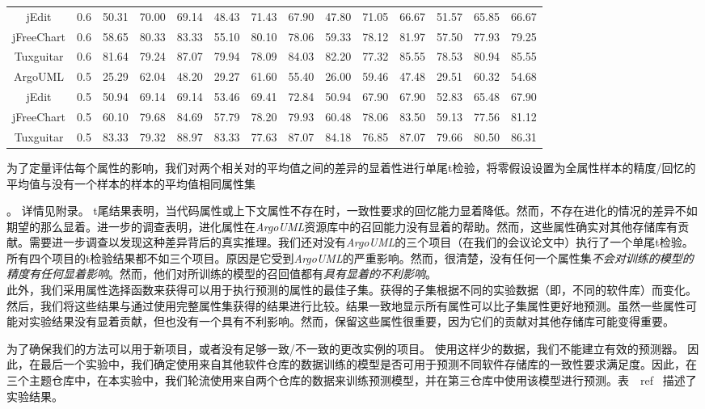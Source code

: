 {\begin{table}[htbp]
\begin{tabular}{cccccccccccccc}
jEdit&0.6&	50.31&	70.00&	69.14&	48.43&	71.43&	67.90&	47.80&	71.05&	66.67&	51.57&	65.85&	66.67\\
jFreeChart&0.6&	58.65&	80.33&	83.33&	55.10&	80.10&	78.06&	59.33&	78.12&	81.97&	57.50&	77.93&	79.25\\
Tuxguitar&0.6&	81.64&	79.24&	87.07&	79.94&	78.09&	84.03&	82.20&	77.32&	85.55&	78.53&	80.94&	85.55\\
ArgoUML&0.5&	25.29&	62.04&	48.20&	29.27&	61.60&	55.40&	26.00&	59.46&	47.48&	29.51&	60.32&	54.68\\
jEdit&0.5&	50.94&	69.14&	69.14&	53.46&	69.41&	72.84&	50.94&	67.90&	67.90&	52.83&	65.48&	67.90\\
jFreeChart&0.5&	60.10&	79.68&	84.69&	57.79&	78.20&	79.93&	60.48&	78.06&	83.50&	59.13&	77.56&	81.12\\
Tuxguitar&0.5&	83.33&	79.32&	88.97&	83.33&	77.63&	87.07&	84.18&	76.85&	87.07&	79.66&	80.50&      86.31\\
\bottomrule[1.5pt]
\end{tabular}
\end{table}

为了定量评估每个属性的影响，我们对两个相关对的平均值之间的差异的显着性进行单尾t检验，将零假设设置为全属性样本的精度/回忆的平均值与没有一个样本的样本的平均值相同属性集}。
详情见附录。 t尾结果表明，当代码属性或上下文属性不存在时，一致性要求的回忆能力显着降低。然而，不存在进化的情况的差异不如期望的那么显着。进一步的调查表明，进化属性在{\em ArgoUML}资源库中的召回能力没有显着的帮助。然而，这些属性确实对其他存储库有贡献。需要进一步调查以发现这种差异背后的真实推理。{我们还对没有{\em  ArgoUML}的三个项目（在我们的会议论文中）执行了一个单尾t检验。所有四个项目的t检验结果都不如三个项目。原因是它受到{\em ArgoUML}的严重影响。}然而，很清楚，没有任何一个属性集{\em 不会对训练的模型的精度有任何显着影响}。然而，他们对所训练的模型的召回值都有{\em 具有显着的不利影响}。 \\

此外，我们采用属性选择函数来获得可以用于执行预测的属性的最佳子集。获得的子集根据不同的实验数据（即，不同的软件库）而变化。然后，我们将这些结果与通过使用完整属性集获得的结果进行比较。结果一致地显示所有属性可以比子集属性更好地预测。虽然一些属性可能对实验结果没有显着贡献，但也没有一个具有不利影响。然而，保留这些属性很重要，因为它们的贡献对其他存储库可能变得重要。


为了确保我们的方法可以用于新项目，或者没有足够一致/不一致的更改实例的项目。 使用这样少的数据，我们不能建立有效的预测器。 因此，在最后一个实验中，我们确定使用来自其他软件仓库的数据训练的模型是否可用于预测不同软件存储库的一致性要求满足度。因此，在三个主题仓库中，在本实验中，我们轮流使用来自两个仓库的数据来训练预测模型，并在第三仓库中使用该模型进行预测。表~\ ref {}~描述了实验结果。

